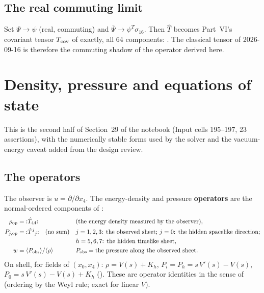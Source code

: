 \subsection{The real commuting limit}
\label{sec:7.6}

Set $\Psi\to\psi$ (real, commuting) and $\bar\Psi\to\psi^{T}\sigma_{16}$. Then $\hat T$ becomes
Part~VI's covariant tensor $T_{\mathrm{cov}}$ of  exactly, all 64 components:
. The classical tensor of 2026-09-16 is therefore the commuting shadow of the
operator derived here.

\section{Density, pressure and equations of state}
\label{sec:8}

This is the second half of Section~29 of the notebook (Input cells 195--197, 23 assertions), with the
numerically stable forms used by the solver and the vacuum-energy caveat added from the design
review.

\subsection{The operators}
\label{sec:8.1}

The observer is $u=\partial/\partial x_4$. The energy-density and pressure \textbf{operators} are the
normal-ordered components of :
\begin{align*}
  \rho_{\mathrm{op}}&={:}\hat T_{44}{:} &&\text{(the energy density measured by the observer)},\\
  P_{j,\mathrm{op}}&={:}\hat T^j{}_j{:}\quad(\text{no sum}) &&j=1,2,3\text{: the observed sheet; } j=0\text{: the hidden spacelike direction;}\\
  & &&h=5,6,7\text{: the hidden timelike sheet},\\
  w&=\langle P_{\mathrm{obs}}\rangle/\langle\rho\rangle &&P_{\mathrm{obs}}=\text{the pressure along the observed sheet}.
\end{align*}
On shell, for fields of $(x_0,x_4)$: $\rho=V(s)+K_h$, $P_i=P_h=s\,V'(s)-V(s)$,
$P_0=s\,V'(s)-V(s)+K_h$ (). These are operator identities in the sense of
 (ordering by the Weyl rule; exact for linear $V$).

